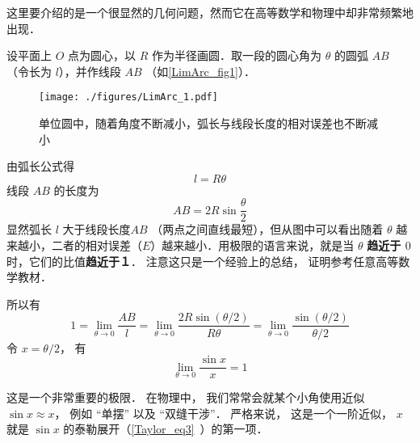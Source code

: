 

这里要介绍的是一个很显然的几何问题，然而它在高等数学和物理中却非常频繁地出现．

设平面上 $O$ 点为圆心，以 $R$ 作为半径画圆．取一段的圆心角为 $\theta $ 的圆弧 $AB$ （令长为 $l$），并作线段 $AB$ （如\autoref{LimArc_fig1}）．

\begin{figure}[ht]
\centering
\texttt{[image: ./figures/LimArc\_1.pdf]}
\caption{单位圆中，随着角度不断减小，弧长与线段长度的相对误差也不断减小}\label{LimArc_fig1}
\end{figure}

由弧长公式得
\begin{equation} \label{LimArc_eq1}
l = R\theta 
\end{equation}
线段 $AB$ 的长度为
\begin{equation}\label{LimArc_eq2}
AB = 2R\sin \frac{\theta }{2}
\end{equation}
显然弧长 $l$ 大于线段长度$AB$ （两点之间直线最短），但从图中可以看出随着 $\theta $ 越来越小，二者的相对误差（$E$）越来越小．用极限的语言来说，就是当 $\theta $ \textbf{趋近于 $0$ } 时，它们的比值\textbf{趋近于１}． 注意这只是一个经验上的总结， 证明参考任意高等数学教材． %

所以有
\begin{equation}
1=\lim_{\theta\to 0} \frac{AB}{l} = \lim_{\theta\to 0} \frac{2R\sin (\theta/2)}{R\theta} 
= \lim_{\theta\to 0}\frac{\sin (\theta/2)}{\theta/2}
\end{equation}
令 $x = \theta/2$， 有
\begin{equation}
\lim_{\theta\to 0} \frac{\sin x}{x} = 1
\end{equation}

这是一个非常重要的极限． 在物理中， 我们常常会就某个小角使用近似 $\sin x \approx x$， 例如 “单摆” 以及 “双缝干涉”． 严格来说， 这是一个一阶近似， $x$ 就是 $\sin x$ 的泰勒展开（\autoref{Taylor_eq3}~）的第一项．
